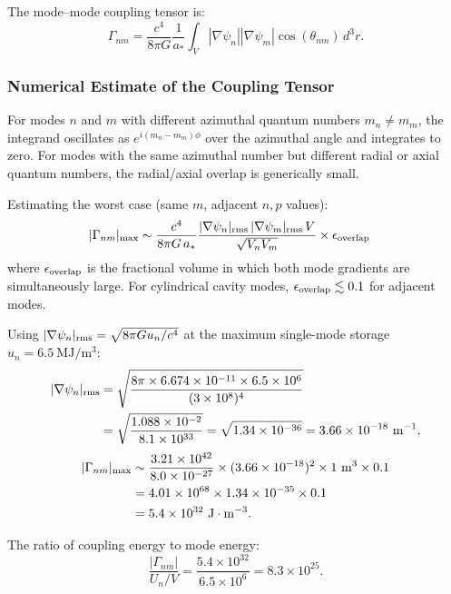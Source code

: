 \documentclass[aps,prd,twocolumn,superscriptaddress]{revtex4-2}
\newcommand{\astar}{a_*}
\begin{document}
The mode--mode coupling tensor is:
\begin{equation}
\Gamma_{nm} = \frac{c^4}{8\pi G}\frac{1}{\astar}
\int_V |\nabla\psi_n||\nabla\psi_m|\cos(\theta_{nm})\,d^3r.
\end{equation}

\subsubsection{Numerical Estimate of the Coupling Tensor}

For modes $n$ and $m$ with different azimuthal quantum numbers
$m_n \neq m_m$, the integrand oscillates as $e^{i(m_n - m_m)\phi}$
over the azimuthal angle and integrates to zero.  For modes with the
same azimuthal number but different radial or axial quantum numbers,
the radial/axial overlap is generically small.

Estimating the worst case (same $m$, adjacent $n,p$ values):
\begin{align}
|\Gamma_{nm}|_{\rm max} &\sim \frac{c^4}{8\pi G\,\astar}
\frac{|\nabla\psi_n|_{\rm rms}\,|\nabla\psi_m|_{\rm rms}\,V}{\sqrt{V_n V_m}}
\times\epsilon_{\rm overlap}
\end{align}
where $\epsilon_{\rm overlap}$ is the fractional volume in which both
mode gradients are simultaneously large.  For cylindrical cavity modes,
$\epsilon_{\rm overlap} \lesssim 0.1$ for adjacent modes.

Using $|\nabla\psi_n|_{\rm rms} = \sqrt{8\pi G u_n/c^4}$ at the
maximum single-mode storage $u_n = 6.5~\mathrm{MJ/m^3}$:
\begin{align}
|\nabla\psi_n|_{\rm rms} &= \sqrt{\frac{8\pi\times 6.674\times 10^{-11}
\times 6.5\times 10^6}{(3\times 10^8)^4}} \notag\\
&= \sqrt{\frac{1.088\times 10^{-2}}{8.1\times 10^{33}}}
= \sqrt{1.34\times 10^{-36}} = 3.66\times 10^{-18}~\mathrm{m^{-1}},
\end{align}
\begin{align}
|\Gamma_{nm}|_{\rm max} &\sim \frac{3.21\times 10^{42}}{8.0\times 10^{-27}}
\times(3.66\times 10^{-18})^2\times 1~\mathrm{m^3}\times 0.1 \notag\\
&= 4.01\times 10^{68}\times 1.34\times 10^{-35}\times 0.1 \notag\\
&= 5.4\times 10^{32}~\mathrm{J\cdot m^{-3}}.
\end{align}

The ratio of coupling energy to mode energy:
\begin{equation}
\frac{|\Gamma_{nm}|}{U_n/V} = \frac{5.4\times 10^{32}}{6.5\times 10^6}
= 8.3\times 10^{25}.
\end{equation}
\end{document}
